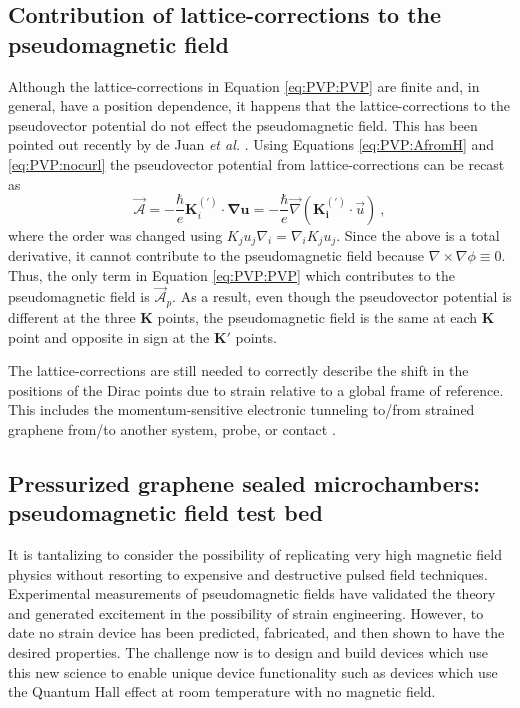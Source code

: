 \subsection{Contribution of lattice-corrections to the pseudomagnetic field}
Although the lattice-corrections in Equation \ref{eq:PVP:PVP} are finite and, in general, have a position dependence, it happens that the lattice-corrections to the pseudovector potential do not effect the pseudomagnetic field.
This has been pointed out recently by de Juan \textit{et al.} \cite{DeJuan2013}. 
Using Equations \ref{eq:PVP:AfromH} and \ref{eq:PVP:nocurl} the pseudovector potential from lattice-corrections can be recast as 
\begin{equation*}
  \vec{\mathcal{A}}=-\frac{\hbar}{e} \bm{K}_i^{(')} \cdot \bm{\nabla u} 
  = - \frac{\hbar}{e} \vec{\nabla} \left( \bm{K_i^{(')}} \cdot \vec{u} \right) \ ,
\end{equation*}
where the order was changed using $K_j u_j \nabla_i=\nabla_i K_j u_j$.
Since the above is a total derivative, it cannot contribute to the pseudomagnetic field because $\nabla\times\nabla \phi \equiv 0$.
Thus, the only term in Equation \ref{eq:PVP:PVP} which contributes to the pseudomagnetic field is $\vec{\mathcal{A}}_p$.
As a result, even though the pseudovector potential is different at the three $\bm{K}$ points, the pseudomagnetic field is the same at each $\bm{K}$ point and opposite in sign at the $\bm{K}'$ points.

The lattice-corrections are still needed to correctly describe the shift in the positions of the Dirac points due to strain relative to a global frame of reference.
This includes the momentum-sensitive electronic tunneling to/from strained graphene from/to another system, probe, or contact \cite{Fogler2008}.

\subsection{Pressurized graphene sealed microchambers: pseudomagnetic field test bed}
It is tantalizing to consider the possibility of replicating very high magnetic field physics without resorting to expensive and destructive pulsed field techniques.
Experimental measurements of pseudomagnetic fields \cite{Levy2010,Yan2012,Yeh2011,Gomes2012} have validated the theory and generated excitement in the possibility of strain engineering.
However, to date no strain device has been predicted, fabricated, and then shown to have the desired properties.
The challenge now is to design and build devices which use this new science to enable unique device functionality such as devices which use the Quantum Hall effect at room temperature with no magnetic field.


